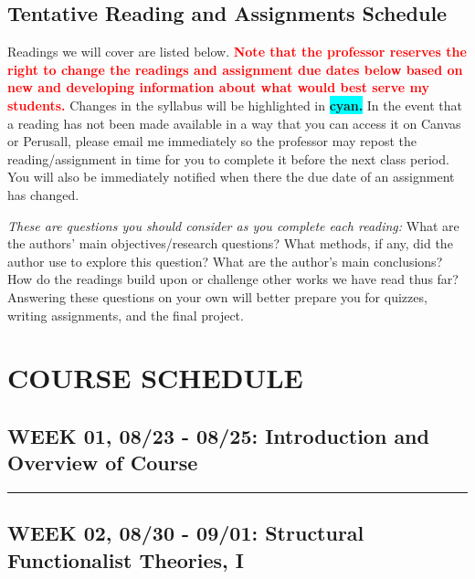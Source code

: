 \documentclass[11pt,]{article}
\begin{document}
\hypertarget{tentative-reading-and-assignments-schedule}{%
\subsection{Tentative Reading and Assignments
Schedule}\label{tentative-reading-and-assignments-schedule}}

Readings we will cover are listed below.
\textcolor{red}{\bf{Note that the professor reserves the right to change the readings and assignment due dates below based on new and developing information about what would best serve my students.}}
Changes in the syllabus will be highlighted in
\colorbox{Cyan}{\bf{cyan.}} In the event that a reading has not been
made available in a way that you can access it on Canvas or Perusall,
please email me immediately so the professor may repost the
reading/assignment in time for you to complete it before the next class
period. You will also be immediately notified when there the due date of
an assignment has changed.

\emph{These are questions you should consider as you complete each
reading:} What are the authors' main objectives/research questions? What
methods, if any, did the author use to explore this question? What are
the author's main conclusions? How do the readings build upon or
challenge other works we have read thus far? Answering these questions
on your own will better prepare you for quizzes, writing assignments,
and the final project.

\hypertarget{course-schedule}{%
\section{COURSE SCHEDULE}\label{course-schedule}}

\hypertarget{week-01-0823---0825-introduction-and-overview-of-course}{%
\subsection{WEEK 01, 08/23 - 08/25: Introduction and Overview of
Course}\label{week-01-0823---0825-introduction-and-overview-of-course}}

\bigbreak
\hrule

\hypertarget{week-02-0830---0901-structural-functionalist-theories-i}{%
\subsection{WEEK 02, 08/30 - 09/01: Structural Functionalist Theories,
I}\label{week-02-0830---0901-structural-functionalist-theories-i}}
\end{document}
